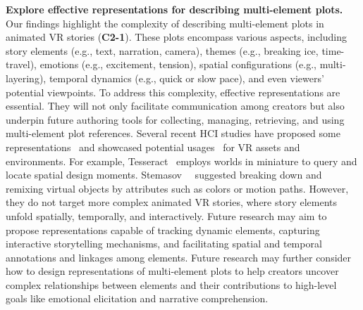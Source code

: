 \textbf{Explore effective representations for describing multi-element plots.}
Our findings highlight the complexity of describing multi-element plots in animated VR stories (\textbf{C2-1}). These plots encompass various aspects, including story elements (e.g., text, narration, camera), themes (e.g., breaking ice, time-travel), emotions (e.g., excitement, tension), spatial configurations (e.g., multi-layering), temporal dynamics (e.g., quick or slow pace), and even viewers' potential viewpoints.
To address this complexity, effective representations are essential. They will not only facilitate communication among creators but also underpin future authoring tools for collecting, managing, retrieving, and using multi-element plot references. 
Several recent HCI studies have proposed some representations~\cite{liu2019view, mahadevan2023tesseract} and showcased potential usages~\cite{stemasov2023sampling, mahadevan2023tesseract} for VR assets and environments.
For example, Tesseract~\cite{mahadevan2023tesseract} employs worlds in miniature to query and locate spatial design moments. 
Stemasov~\etal~\cite{stemasov2023sampling} suggested breaking down and remixing virtual objects by attributes such as colors or motion paths.
However, they do not target more complex animated VR stories, where story elements unfold spatially, temporally, and interactively. Future research may aim to propose representations capable of tracking dynamic elements, capturing interactive storytelling mechanisms, and facilitating spatial and temporal annotations and linkages among elements. Future research may further consider how to design representations of multi-element plots to help creators uncover complex relationships between elements and their contributions to high-level goals like emotional elicitation and narrative comprehension.

